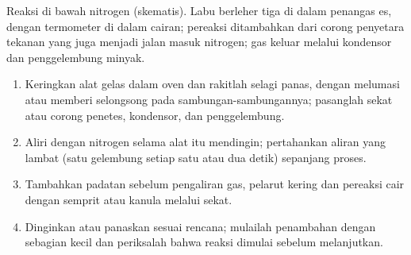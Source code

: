 \begin{omfigure}
\par\vspace{4pt}

{\small Reaksi di bawah nitrogen (skematis). Labu berleher tiga di dalam
penangas es, dengan termometer di dalam cairan; pereaksi ditambahkan dari
corong penyetara tekanan yang juga menjadi jalan masuk nitrogen; gas keluar
melalui kondensor dan penggelembung minyak.}
\end{omfigure}

\begin{method}\label{met:b2:lab-techniques-2:anhydrous}
\begin{enumerate}
  \item Keringkan alat gelas dalam oven dan rakitlah selagi panas, dengan
        melumasi atau memberi selongsong pada sambungan-sambungannya;
        pasanglah sekat atau corong penetes, kondensor, dan penggelembung.
  \item Aliri dengan nitrogen selama alat itu mendingin; pertahankan aliran
        yang lambat (satu gelembung setiap satu atau dua detik) sepanjang
        proses.
  \item Tambahkan padatan sebelum pengaliran gas, pelarut kering dan
        pereaksi cair dengan semprit atau kanula melalui sekat.
  \item Dinginkan atau panaskan sesuai rencana; mulailah penambahan dengan
        sebagian kecil dan periksalah bahwa reaksi dimulai sebelum
        melanjutkan.
\end{enumerate}
\end{method}

